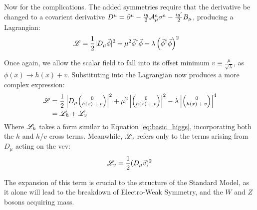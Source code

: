         Now for the complications.
        The added symmetries require that the derivative be changed to a covarient derivative 
            $D^{\mu} = \partial^{\mu} - \frac{ig}{2} \mathcal{A}^a_{\mu} \sigma^a - \frac{ig'}{2} B_{\mu}$,
            producing a Lagrangian:
        \begin{equation} \begin{split}
            \mathscr{L} &= \frac{1}{2} |D_{\mu} \vec{\phi}|^2 +
                \mu^2 \vec{\phi}^\dag \vec{\phi} - \lambda \left( \vec{\phi}^\dag\vec{\phi} \right)^2
        \end{split} \end{equation}

        Once again, we allow the scalar field to fall into its offset minimum $v \equiv \frac{\mu}{\sqrt{\lambda}}$, as $\phi(x) \rightarrow h(x) + v$.
        Substituting into the Lagrangian now produces a more complex expression:
        \begin{equation} \begin{split}
            \label{eq:fullHiggs}
            \Lag & = \frac{1}{2} \left|D_{\mu} \minimatrix{0\\h(x)+v}\right|^2
                + \mu^2 \left|\minimatrix{0\\h(x)+v}\right|^2
                - \lambda \left|\minimatrix{0\\h(x)+v}\right|^4 \\
             & = \Lag_h + \Lag_v
        \end{split} \end{equation}
        Where $\mathscr{L}_h$ takes a form similar to Equation \ref{eq:basic_higgs}, incorporating both the $h$ and $h$/$v$ cross terms.
        Meanwhile, $\mathscr{L}_v$ refers only to the terms arising from $D_{\mu}$ acting on the vev:
        \begin{equation}
            \label{eq:lagv}
            \mathscr{L}_v = \frac{1}{2} (D_{\mu} \vec{v})^2
        \end{equation}

        The expansion of this term is crucial to the structure of the Standard Model,
            as it alone will lead to the breakdown of Electro-Weak Symmetry,
            and the $W$ and $Z$ bosons acquiring mass.

